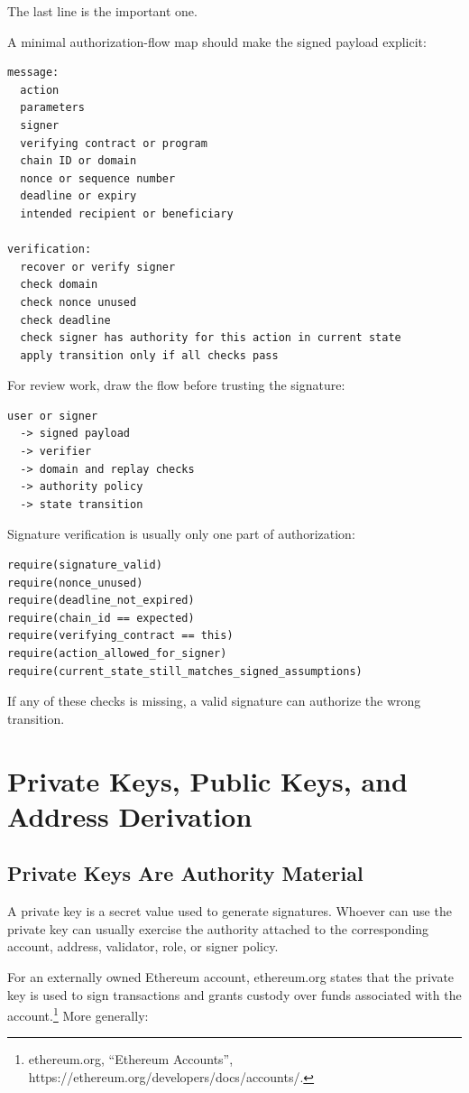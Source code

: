 The last line is the important one.


A minimal authorization-flow map should make the signed payload explicit:

\begin{lstlisting}
message:
  action
  parameters
  signer
  verifying contract or program
  chain ID or domain
  nonce or sequence number
  deadline or expiry
  intended recipient or beneficiary

verification:
  recover or verify signer
  check domain
  check nonce unused
  check deadline
  check signer has authority for this action in current state
  apply transition only if all checks pass
\end{lstlisting}

For review work, draw the flow before trusting the signature:

\begin{lstlisting}
user or signer
  -> signed payload
  -> verifier
  -> domain and replay checks
  -> authority policy
  -> state transition
\end{lstlisting}

Signature verification is usually only one part of authorization:

\begin{lstlisting}
require(signature_valid)
require(nonce_unused)
require(deadline_not_expired)
require(chain_id == expected)
require(verifying_contract == this)
require(action_allowed_for_signer)
require(current_state_still_matches_signed_assumptions)
\end{lstlisting}

If any of these checks is missing, a valid signature can authorize the
wrong transition.

\section{Private Keys, Public Keys, and Address Derivation}

\subsection{Private Keys Are Authority Material}

A private key is a secret value used to generate signatures. Whoever can
use the private key can usually exercise the authority attached to the
corresponding account, address, validator, role, or signer policy.

For an externally owned Ethereum account, ethereum.org states that the
private key is used to sign transactions and grants custody over funds
associated with the account.\footnote{ethereum.org, ``Ethereum
  Accounts'', https://ethereum.org/developers/docs/accounts/.} More
generally:

